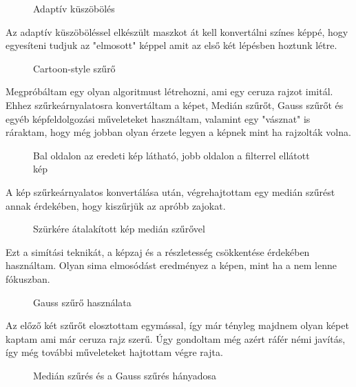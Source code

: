 \begin{figure}[ht]
\centering
{}
\caption{Adaptív küszöbölés  } 
\label{fig: cartoon4}
\end{figure}
Az adaptív küszöböléssel elkészült maszkot át kell konvertálni színes képpé, hogy egyesíteni tudjuk az "elmosott" képpel amit az első két lépésben hoztunk létre.
\begin{figure}[ht]
\centering
{}
\caption{Cartoon-style szűrő } 
\label{fig: cartoon5}
\end{figure}
Megpróbáltam egy olyan algoritmust létrehozni, ami egy ceruza rajzot imitál. Ehhez szűrkeárnyalatosra konvertáltam a képet, Medián szűrőt, Gauss szűrőt és egyéb képfeldolgozási műveleteket használtam, valamint egy "vásznat" is ráraktam, hogy még jobban olyan érzete legyen a képnek mint ha rajzolták volna.
\begin{figure}[ht]
\centering
{}
\caption{Bal oldalon az eredeti kép látható, jobb oldalon a filterrel ellátott kép } 
\label{fig: pencil1}
\end{figure}
A kép szűrkeárnyalatos konvertálása után, végrehajtottam egy medián szűrést annak érdekében, hogy kiszűrjük az apróbb zajokat.
\begin{figure}[ht]
\centering
{}
\caption{Szürkére átalakított kép medián szűrővel  } 
\label{fig: pencil2}
\end{figure}
Ezt a simítási teknikát, a képzaj  és a részletesség csökkentése érdekében használtam. Olyan sima elmosódást eredményez a képen, mint ha a nem lenne fókuszban.
\begin{figure}[ht]
\centering
{}
\caption{Gauss szűrő használata } 
\label{fig: pencil3}
\end{figure}
Az előző két szűrőt elosztottam egymással, így már tényleg majdnem olyan képet kaptam ami már ceruza rajz szerű. Úgy gondoltam még azért ráfér némi javítás, így még további műveleteket hajtottam végre rajta.
\begin{figure}[ht] 
\centering
{}
\caption{Medián szűrés és a Gauss szűrés hányadosa } 
\label{fig: pencil4}
\end{figure}
